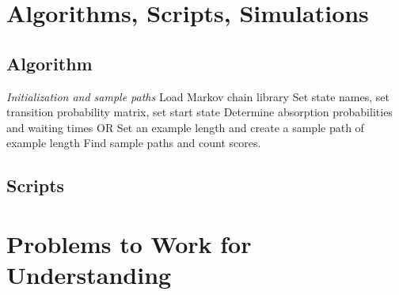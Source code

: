 \documentclass[12pt]{article}
\begin{document}
\section*{Algorithms, Scripts, Simulations}

\subsection*{Algorithm}

\begin{algorithm}[H]
    \DontPrintSemicolon
    \BlankLine
    \emph{Initialization and sample paths}\;
    Load Markov chain library\;
    Set state names, set transition probability matrix, set start
    state\;
    Determine absorption probabilities and waiting times OR\;
    Set an example length and create a sample path of example length\;
    Find sample paths and count scores.\;
\end{algorithm}

\subsection*{Scripts}



\hr

\section*{Problems to Work for Understanding}
\renewcommand{\theexerciseseries}{}
\renewcommand{\theexercise}{\arabic{exercise}}
\end{document}
